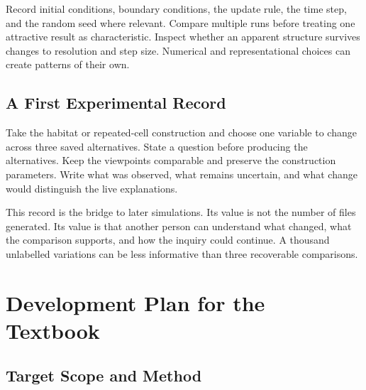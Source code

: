\documentclass[11pt,openany]{book}
\begin{document}
Record initial conditions, boundary conditions, the update rule, the time step, and the random seed where relevant. Compare multiple runs before treating one attractive result as characteristic. Inspect whether an apparent structure survives changes to resolution and step size. Numerical and representational choices can create patterns of their own.

\section{A First Experimental Record}

\begin{exercise}
Take the habitat or repeated-cell construction and choose one variable to change across three saved alternatives. State a question before producing the alternatives. Keep the viewpoints comparable and preserve the construction parameters. Write what was observed, what remains uncertain, and what change would distinguish the live explanations.
\end{exercise}

This record is the bridge to later simulations. Its value is not the number of files generated. Its value is that another person can understand what changed, what the comparison supports, and how the inquiry could continue. A thousand unlabelled variations can be less informative than three recoverable comparisons.





























\chapter*{Development Plan for the Textbook}

\section*{Target Scope and Method}
\end{document}
